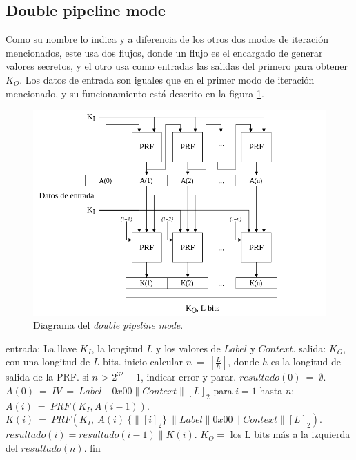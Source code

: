 \subsection{Double pipeline mode}
Como su nombre lo indica y a diferencia de los otros dos modos de iteración
mencionados, este usa dos flujos, donde un flujo es el encargado de generar
valores secretos, y el otro usa como entradas las salidas del primero para
obtener $K_O$. Los datos de entrada son iguales que en el primer modo de
iteración mencionado, y su funcionamiento está descrito en la figura
\ref{diagrama_dpipeline_mode}.

\begin{figure}
  \begin{center}
    \includegraphics[width=0.75\linewidth]{diagramas/dpipeline_mode}
    \caption{Diagrama del \textit{double pipeline mode}.}
    \label{diagrama_dpipeline_mode}
   \end{center}
\end{figure}

\begin{pseudocodigo}[caption={Funcionamiento del \textit{double pipeline mode}.},
label={mi:3}]
    entrada:   La llave $K_I$, la longitud $L$ y los valores de $Label$ y $Context$.
    salida:    $K_O$, con una longitud de $L$ bits.
    inicio
      calcular $n\: =\: [\frac{L}{h}]$, donde $h$ es la longitud de salida de la PRF.
      si $n$ > $2^{32}-1$, indicar error y parar.
      $resultado(0)\: =\: \emptyset$.
      $A(0)\: =\: IV\: =\: Label \parallel 0x00 \parallel Context \parallel {[L]}_2$
      para $i=1$ hasta $n$:
        $A(i)\: =\: PRF(K_I, A(i-1))$.
        $K(i)\: =\: PRF(K_I,\: A(i)\: \{\parallel {[i]}_2\}\: \parallel Label \parallel 0x00 \parallel Context \parallel {[L]}_2)$.
        $resultado(i) = resultado(i-1) \parallel K(i)$.
      $K_O =$ los L bits más a la izquierda del $resultado(n)$.
    fin
\end{pseudocodigo}

